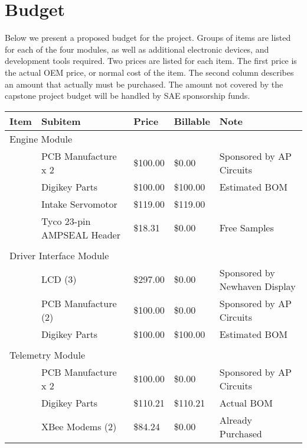 %
%
%
%

\chapter{Budget}

Below we present a proposed budget for the project. Groups of items are listed for each of the four modules, as well as additional electronic devices, and development tools required. Two prices are listed for each item. The first price is the actual OEM price, or normal cost of the item. The second column describes an amount that actually must be purchased. The amount not covered by the capstone project budget will be handled by SAE sponsorship funds.

\centering
\begin{scriptsize}
  \begin{tabular}{|l|>{\raggedright}p{}|l|l|>{\raggedright}p{}|}
    \hline 
    Item & Subitem & Price & Billable & Note\tabularnewline
    \hline
    \hline 
    \multicolumn{2}{|l|}{Engine Module} &  &  & \tabularnewline
    \hline 
    & PCB Manufacture x 2 & \$100.00 & \$0.00 & Sponsored by AP Circuits\tabularnewline
    \hline 
    & Digikey Parts & \$100.00 & \$100.00 & Estimated BOM\tabularnewline
    \hline 
    & Intake Servomotor & \$119.00 & \$119.00 & \tabularnewline
    \hline 
    & Tyco 23-pin AMPSEAL Header & \$18.31 & \$0.00 & Free Samples\tabularnewline
    \hline 
    \multicolumn{1}{|l}{} & \multicolumn{1}{>{\raggedright}p{0.35\columnwidth}}{} & \multicolumn{1}{l}{} & \multicolumn{1}{l}{} & \tabularnewline
    \hline 
    \multicolumn{2}{|l|}{Driver Interface Module} &  &  & \tabularnewline
    \hline 
    & LCD (3) & \$297.00 & \$0.00 & Sponsored by Newhaven Display\tabularnewline
    \hline 
    & PCB Manufacture (2) & \$100.00 & \$0.00 & Sponsored by AP Circuits\tabularnewline
    \hline 
    & Digikey Parts & \$100.00 & \$100.00 & Estimated BOM\tabularnewline
    \hline 
    \multicolumn{1}{|l}{} & \multicolumn{1}{>{\raggedright}p{0.35\columnwidth}}{} & \multicolumn{1}{l}{} & \multicolumn{1}{l}{} & \tabularnewline
    \hline 
    \multicolumn{2}{|l|}{Telemetry Module} &  &  & \tabularnewline
    \hline 
    & PCB Manufacture x 2 & \$100.00 & \$0.00 & Sponsored by AP Circuits\tabularnewline
    \hline 
    & Digikey Parts & \$110.21 & \$110.21 & Actual BOM\tabularnewline
    \hline 
    & XBee Modems (2) & \$84.24 & \$0.00 & Already Purchased\tabularnewline

\end{tabular}
\end{scriptsize}
